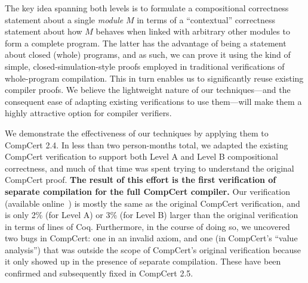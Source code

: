 The key idea spanning both levels is to formulate a compositional correctness statement about a
single \emph{module} $M$ in terms of a ``contextual'' correctness statement about how $M$ behaves
when linked with arbitrary other modules to form a complete program.  The latter has the advantage
of being a statement about closed (whole) programs, and as such, we can prove it using the kind of
simple, closed-simulation-style proofs employed in traditional verifications of whole-program
compilation.  This in turn enables us to significantly reuse existing compiler proofs.  We believe
the lightweight nature of our techniques---and the consequent ease of adapting existing
verifications to use them---will make them a highly attractive option for compiler verifiers.

We demonstrate the effectiveness of our techniques by applying them to CompCert 2.4.  In less than
two person-months total, we adapted the existing CompCert verification to support both Level A and
Level B compositional correctness, and much of that time was spent trying to understand the original
CompCert proof.  \textbf{The result of this effort is the first verification of separate compilation
  for the full CompCert compiler.}  Our verification (available online~\cite{kang-phd-thesis-web})
is mostly the same as the original CompCert verification, and is only 2\% (for Level A) or 3\% (for
Level B) larger than the original verification in terms of lines of Coq.  Furthermore, in the course
of doing so, we uncovered two bugs in CompCert: one in an invalid axiom, and one (in CompCert's
``value analysis'') that was outside the scope of CompCert's original verification because it only
showed up in the presence of separate compilation.  These have been confirmed and subsequently fixed
in CompCert 2.5.




